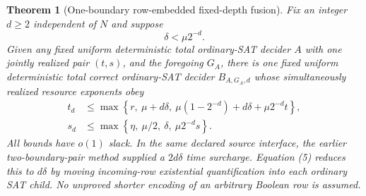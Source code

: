 \documentclass[11pt]{article}
\newtheorem{theorem}{Theorem}
\begin{document}
\begin{theorem}[One-boundary row-embedded fixed-depth fusion]
Fix an integer $d\ge2$ independent of $N$ and suppose
\[
\boxed{\delta<\mu 2^{-d}.}\tag{4}
\]
Given any fixed uniform deterministic total ordinary-SAT decider $A$
with one jointly realized pair $(t,s)$, and the foregoing $G_A$, there
is one fixed uniform deterministic total correct ordinary-SAT decider
$B_{A,G_A,d}$ whose simultaneously realized resource exponents obey
\[
\boxed{\begin{aligned}
t_d&\le\max\left\{r,\ \mu+d\delta,\
\mu(1-2^{-d})+d\delta+\mu2^{-d}t\right\},\\
s_d&\le\max\left\{\eta,\ \mu/2,\ \delta,\ \mu2^{-d}s\right\}.
\end{aligned}}\tag{5}
\]
All bounds have $o(1)$ slack. In the same declared source interface,
the earlier two-boundary-pair method supplied a $2d\delta$ time
surcharge. Equation (5) reduces this to $d\delta$ by moving
incoming-row existential quantification into each ordinary SAT child.
No \emph{unproved} shorter encoding of an arbitrary Boolean row is assumed.
\end{theorem}
\end{document}
